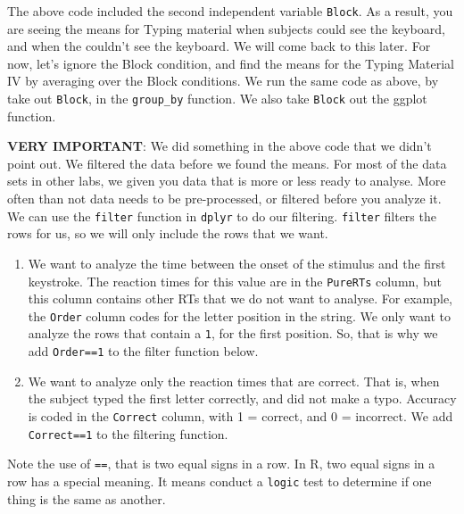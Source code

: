 \documentclass[
]{book}
\begin{document}
The above code included the second independent variable \texttt{Block}. As a result, you are seeing the means for Typing material when subjects could see the keyboard, and when the couldn't see the keyboard. We will come back to this later. For now, let's ignore the Block condition, and find the means for the Typing Material IV by averaging over the Block conditions. We run the same code as above, by take out \texttt{Block}, in the \texttt{group\_by} function. We also take \texttt{Block} out the ggplot function.

\textbf{VERY IMPORTANT}: We did something in the above code that we didn't point out. We filtered the data before we found the means. For most of the data sets in other labs, we given you data that is more or less ready to analyse. More often than not data needs to be pre-processed, or filtered before you analyze it. We can use the \texttt{filter} function in \texttt{dplyr} to do our filtering. \texttt{filter} filters the rows for us, so we will only include the rows that we want.

\begin{enumerate}
\def\labelenumi{\arabic{enumi}.}
\item
  We want to analyze the time between the onset of the stimulus and the first keystroke. The reaction times for this value are in the \texttt{PureRTs} column, but this column contains other RTs that we do not want to analyse. For example, the \texttt{Order} column codes for the letter position in the string. We only want to analyze the rows that contain a \texttt{1}, for the first position. So, that is why we add \texttt{Order==1} to the filter function below.
\item
  We want to analyze only the reaction times that are correct. That is, when the subject typed the first letter correctly, and did not make a typo. Accuracy is coded in the \texttt{Correct} column, with 1 = correct, and 0 = incorrect. We add \texttt{Correct==1} to the filtering function.
\end{enumerate}

Note the use of \texttt{==}, that is two equal signs in a row. In R, two equal signs in a row has a special meaning. It means conduct a \texttt{logic} test to determine if one thing is the same as another.
\end{document}
